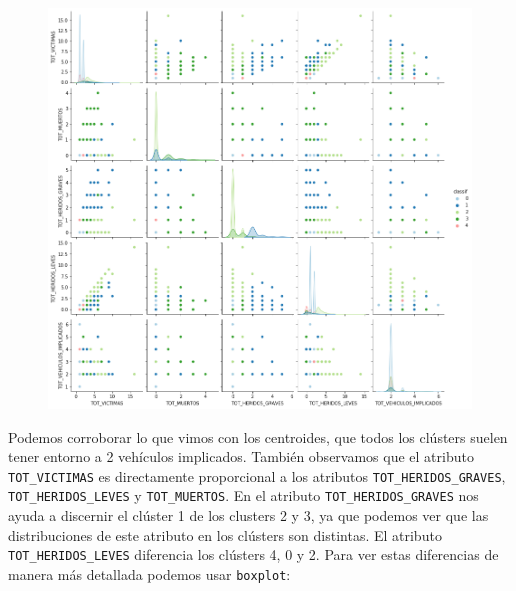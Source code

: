 \documentclass[a4]{article}
\begin{document}
\begin{figure}[H]
  \centering
  \includegraphics[width=140mm]{imagenes/c1_kmeans_pairplot}
\end{figure}

Podemos corroborar lo que vimos con los centroides, que todos los clústers suelen tener entorno a 2 vehículos implicados. También observamos que el atributo \texttt{TOT\_VICTIMAS} es directamente proporcional a los atributos \texttt{TOT\_HERIDOS\_GRAVES}, \texttt{TOT\_HERIDOS\_LEVES} y \texttt{TOT\_MUERTOS}. En el atributo \texttt{TOT\_HERIDOS\_GRAVES} nos ayuda a discernir el clúster 1 de los clusters 2 y 3, ya que podemos ver que las distribuciones de este atributo en los clústers son distintas. El atributo \texttt{TOT\_HERIDOS\_LEVES} diferencia los clústers 4, 0 y 2. Para ver estas diferencias de manera más detallada podemos usar \texttt{boxplot}:
\end{document}
